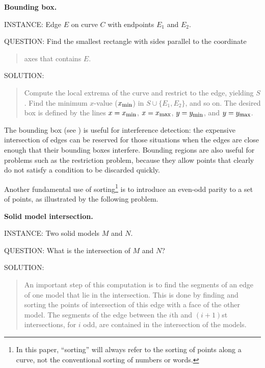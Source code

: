 {\bf Bounding box.}

INSTANCE: Edge $E$ on curve $C$ with endpoints $E_{1}$ and $E_{2}$.

QUESTION: Find the smallest rectangle with sides parallel to the coordinate
\begin{quote}
axes that contains $E$.
\end{quote}

SOLUTION: 
\begin{quote}
Compute the local extrema of the curve and restrict to the edge, yielding $S$.
Find the minimum $x$-value ($x_{\mbox{\footnotesize{min}}}$) 
in $S \cup \{E_{1},E_{2}\}$, and so on.
The desired box is defined by the lines $x = x_{\mbox{\footnotesize{min}}}$, 
$x = x_{\mbox{\footnotesize{max}}}$, $y = y_{\mbox{\footnotesize{min}}}$, 
and $y = y_{\mbox{\footnotesize{max}}}$.
\end{quote}
\vspace{.25in}

The bounding box (see \cite[p. 372]{NS}) is useful for interference detection: 
the expensive intersection of edges can be reserved for those situations when the edges
are close enough that their bounding boxes interfere.
Bounding regions are also useful for problems such as the restriction problem, 
because they allow points that clearly do not satisfy a condition to be discarded
quickly.

Another fundamental use of sorting\footnote{In this paper, ``sorting'' will always
	refer to the sorting of points along a curve, not the conventional sorting of 
	numbers or words.} 
is to introduce an even-odd parity to a
set of points, as illustrated by the following problem.

\vspace{.2in}

{\bf Solid model intersection.}

INSTANCE: Two solid models $M$ and $N$.

QUESTION: What is the intersection of $M$ and $N$?

SOLUTION: 
\begin{quote}
An important step of this computation
is to find the segments of an edge of one model that lie in the intersection.
This is done by finding and sorting the points of intersection 
of this edge with a face of the other model. 
The segments of the edge between the $i$th and $(i+1)$st intersections,
for $i$ odd, are contained in the intersection of the models.
\end{quote}

